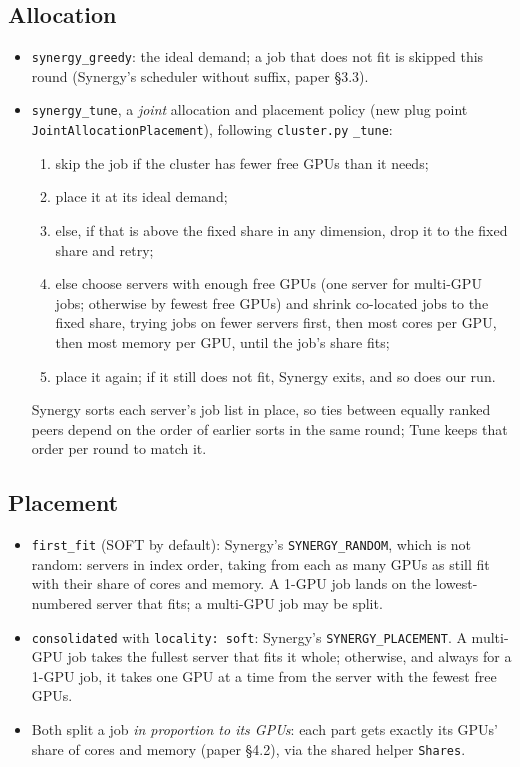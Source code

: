 \documentclass[11pt,a4paper]{article}
\newcommand{\code}[1]{\texttt{#1}}
\begin{document}
\subsection{Allocation}
\begin{itemize}
  \item \code{synergy\_greedy}: the ideal demand; a job that does not fit is skipped this round
        (Synergy's scheduler without suffix, paper \S3.3).
  \item \code{synergy\_tune}, a \emph{joint} allocation and placement policy (new plug point
        \code{JointAllocationPlacement}), following \code{cluster.py} \code{\_tune}:
        \begin{enumerate}
          \item skip the job if the cluster has fewer free GPUs than it needs;
          \item place it at its ideal demand;
          \item else, if that is above the fixed share in any dimension, drop it to the fixed share and retry;
          \item else choose servers with enough free GPUs (one server for multi-GPU jobs; otherwise by
                fewest free GPUs) and shrink co-located jobs to the fixed share, trying jobs on fewer
                servers first, then most cores per GPU, then most memory per GPU, until the job's share fits;
          \item place it again; if it still does not fit, Synergy exits, and so does our run.
        \end{enumerate}
        Synergy sorts each server's job list in place, so ties between equally ranked peers depend on
        the order of earlier sorts in the same round; Tune keeps that order per round to match it.
\end{itemize}

\subsection{Placement}
\begin{itemize}
  \item \code{first\_fit} (SOFT by default): Synergy's \code{SYNERGY\_RANDOM}, which is not random:
        servers in index order, taking from each as many GPUs as still fit with their share of cores
        and memory. A 1-GPU job lands on the lowest-numbered server that fits; a multi-GPU job may be
        split.
  \item \code{consolidated} with \code{locality: soft}: Synergy's \code{SYNERGY\_PLACEMENT}. A multi-GPU
        job takes the fullest server that fits it whole; otherwise, and always for a 1-GPU job, it takes
        one GPU at a time from the server with the fewest free GPUs.
  \item Both split a job \emph{in proportion to its GPUs}: each part gets exactly its GPUs' share of
        cores and memory (paper \S4.2), via the shared helper \code{Shares}.
\end{itemize}
\end{document}
